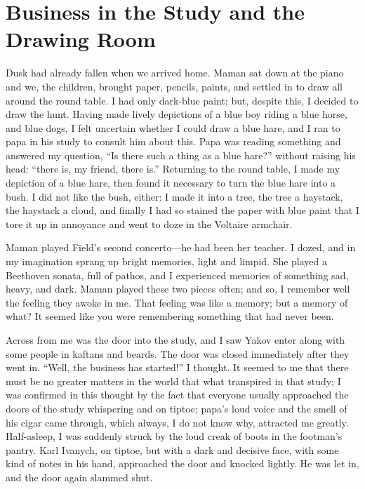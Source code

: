 \chapter{Business in the Study and the Drawing Room}

Dusk had already fallen when we arrived home. Maman sat down at the piano and we, the children, brought paper, pencils, paints, and settled in to draw all around the round table. I had only dark-blue paint; but, despite this, I decided to draw the hunt. Having made lively depictions of a blue boy riding a blue horse, and blue dogs, I felt uncertain whether I could draw a blue hare, and I ran to papa in his study to consult him about this. Papa was reading something and answered my question, ``Is there such a thing as a blue hare?'' without raising his head: ``there is, my friend, there is.'' Returning to the round table, I made my depiction of a blue hare, then found it necessary to turn the blue hare into a bush. I did not like the bush, either: I made it into a tree, the tree a haystack, the haystack a cloud, and finally I had so stained the paper with blue paint that I tore it up in annoyance and went to doze in the Voltaire armchair.

Maman played Field's second concerto---he had been her teacher. I dozed, and in my imagination sprang up bright memories, light and limpid. She played a Beethoven sonata, full of pathos, and I experienced memories of something sad, heavy, and dark. Maman played these two pieces often; and so, I remember well the feeling they awoke in me. That feeling was like a memory; but a memory of what? It seemed like you were remembering something that had never been.

 Across from me was the door into the study, and I saw Yakov enter along with some people in kaftans and beards. The door was closed immediately after they went in. ``Well, the business has started!'' I thought. It seemed to me that there must be no greater matters in the world that what transpired in that study; I was confirmed in this thought by the fact that everyone usually approached the doors of the study whispering and on tiptoe; papa's loud voice and the smell of his cigar came through, which always, I do not know why, attracted me greatly. Half-asleep, I was suddenly struck by the loud creak of boots in the footman's pantry. Karl Ivanych, on tiptoe, but with a dark and decisive face, with some kind of notes in his hand, approached the door and knocked lightly. He was let in, and the door again slammed shut.


